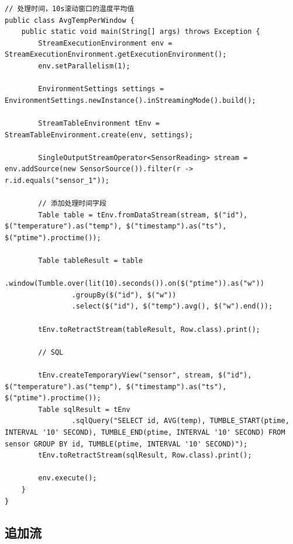 \documentclass[cn,11pt,chinese]{elegantbook}
\begin{document}
\begin{verbatim}
// 处理时间，10s滚动窗口的温度平均值
public class AvgTempPerWindow {
    public static void main(String[] args) throws Exception {
        StreamExecutionEnvironment env = StreamExecutionEnvironment.getExecutionEnvironment();
        env.setParallelism(1);

        EnvironmentSettings settings = EnvironmentSettings.newInstance().inStreamingMode().build();

        StreamTableEnvironment tEnv = StreamTableEnvironment.create(env, settings);

        SingleOutputStreamOperator<SensorReading> stream = env.addSource(new SensorSource()).filter(r -> r.id.equals("sensor_1"));

        // 添加处理时间字段
        Table table = tEnv.fromDataStream(stream, $("id"), $("temperature").as("temp"), $("timestamp").as("ts"), $("ptime").proctime());

        Table tableResult = table
                .window(Tumble.over(lit(10).seconds()).on($("ptime")).as("w"))
                .groupBy($("id"), $("w"))
                .select($("id"), $("temp").avg(), $("w").end());

        tEnv.toRetractStream(tableResult, Row.class).print();

        // SQL

        tEnv.createTemporaryView("sensor", stream, $("id"), $("temperature").as("temp"), $("timestamp").as("ts"), $("ptime").proctime());
        Table sqlResult = tEnv
                .sqlQuery("SELECT id, AVG(temp), TUMBLE_START(ptime, INTERVAL '10' SECOND), TUMBLE_END(ptime, INTERVAL '10' SECOND) FROM sensor GROUP BY id, TUMBLE(ptime, INTERVAL '10' SECOND)");
        tEnv.toRetractStream(sqlResult, Row.class).print();

        env.execute();
    }
}
\end{verbatim}

\subsection{追加流}
\end{document}
